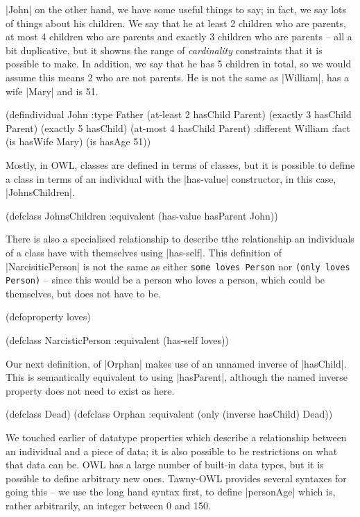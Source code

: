 |John| on the other hand, we have some useful things to say; in fact,
we say lots of things about his children. We say that he at least 2
children who are parents, at most 4 children who are parents and
exactly 3 children who are parents -- all a bit duplicative, but it
showns the range of \emph{cardinality} constraints that it is possible
to make. In addition, we say that he has 5 children in total, so we
would assume this means 2 who are not parents. He is not the same as
|William|, has a wife |Mary| and is 51.

\begin{tawny}
(defindividual John
  :type Father
  (at-least 2 hasChild Parent)
  (exactly 3 hasChild Parent)
  (exactly 5 hasChild)
  (at-most 4 hasChild Parent)
  :different William
  :fact
  (is hasWife Mary)
  (is hasAge 51))
\end{tawny}

Mostly, in OWL, classes are defined in terms of classes, but it is
possible to define a class in terms of an individual with the
|has-value| constructor, in this case, |JohnsChildren|.

\begin{tawny}
(defclass JohnsChildren
  :equivalent (has-value hasParent John))
\end{tawny}

There is also a specialised relationship to describe tthe relationship
an individuals of a class have with themselves using |has-self|. This
definition of |NarcisiticPerson| is not the same as either
\lstinline|some loves Person| nor \lstinline|(only loves Person)| --
since this would be a person who loves a person, which could be
themselves, but does not have to be.

\begin{tawny}
(defoproperty loves)

(defclass NarcisticPerson
  :equivalent (has-self loves))
\end{tawny}

Our next definition, of |Orphan| makes use of an unnamed inverse of
|hasChild|. This is semantically equivalent to using |hasParent|,
although the named inverse property does not need to exist as here.

\begin{tawny}
(defclass Dead)
(defclass Orphan
  :equivalent (only (inverse hasChild) Dead))
\end{tawny}

We touched earlier of datatype properties which describe a
relationship between an individual and a piece of data; it is also
possible to be restrictions on what that data can be. OWL has a large
number of built-in data types, but it is possible to define arbitrary
new ones. Tawny-OWL provides several syntaxes for going this -- we use
the long hand syntax first, to define |personAge| which is, rather
arbitrarily, an integer between 0 and 150.

